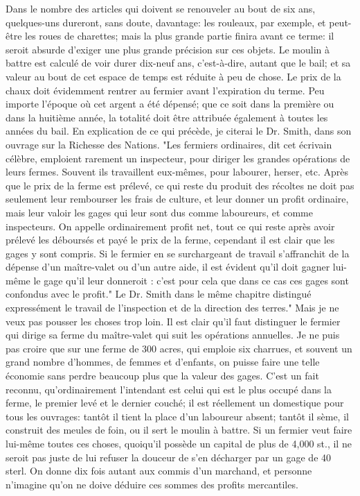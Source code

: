 Dans le nombre des articles qui doivent se renouveler au bout de six ans, quelques-uns dureront, sans doute, davantage: les rouleaux, par exemple, et peut-être les roues de charettes; mais la plus grande partie finira avant ce terme: il seroit absurde d'exiger une plus grande précision sur ces objets. Le moulin à battre est calculé de voir durer dix-neuf ans, c'est-à-dire, autant que le bail; et sa valeur au bout de cet espace de temps est réduite à peu de chose.
Le prix de la chaux doit évidemment rentrer au fermier avant l'expiration du terme. Peu importe l'époque où cet argent a été dépensé; que ce soit dans la première\setcounter{page}{318} ou dans la huitième année, la totalité doit être attribuée également à toutes les années du bail.
En explication de ce qui précède, je citerai le Dr. Smith, dans son ouvrage sur la Richesse des Nations.
"Les fermiers ordinaires, dit cet écrivain célèbre, emploient rarement un inspecteur, pour diriger les grandes opérations de leurs fermes. Souvent ils travaillent eux-mêmes, pour labourer, herser, etc. Après que le prix de la ferme est prélevé, ce qui reste du produit des récoltes ne doit pas seulement leur rembourser les frais de culture, et leur donner un profit ordinaire, mais leur valoir les gages qui leur sont dus comme laboureurs, et comme inspecteurs. On appelle ordinairement profit net, tout ce qui reste après avoir prélevé les déboursés et payé le prix de la ferme, cependant il est clair que les gages y sont compris. Si le fermier en se surchargeant de travail s'affranchit de la dépense d'un maître-valet ou d'un autre aide, il est évident qu'il doit gagner lui-même le gage qu'il leur donneroit : c'est pour cela que dans ce cas ces gages sont confondus avec le profit." Le Dr. Smith dans le\setcounter{page}{319} même chapitre distingué expressément le travail de l'inspection et de la direction des terres."
Mais je ne veux pas pousser les choses trop loin. Il est clair qu'il faut distinguer le fermier qui dirige sa ferme du maître-valet qui suit les opérations annuelles. Je ne puis pas croire que sur une ferme de 300 acres, qui emploie six charrues, et souvent un grand nombre d'hommes, de femmes et d'enfants, on puisse faire une telle économie sans perdre beaucoup plus que la valeur des gages. C'est un fait reconnu, qu'ordinairement l'intendant est celui qui est le plus occupé dans la ferme, le premier levé et le dernier couché; il est réellement un domestique pour tous les ouvrages: tantôt il tient la place d'un laboureur absent; tantôt il sème, il construit des meules de foin, ou il sert le moulin à battre. Si un fermier veut faire lui-même toutes ces choses, quoiqu'il possède un capital de plus de 4,000 st., il ne seroit pas juste de lui refuser la douceur de s'en décharger par un gage de 40 sterl. On donne dix fois autant aux commis d'un marchand, et personne n'imagine qu'on ne doive déduire ces sommes des profits mercantiles.
